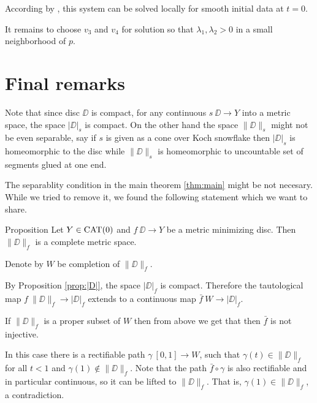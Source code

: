 \documentclass[a4paper,10pt]{amsart}
\begin{document}
According by \cite[Theorem 3.6]{bressan}, this system can be solved locally for smooth initial data at $t=0$.

It remains to choose $v_3$ and $v_4$ for solution so that $\lambda_1, \lambda_2>0$ in a small neighborhood of $p$.
\qeds

\section{Final remarks}

Note that since disc $\DD$ is compact, 
for any continuous $s\:\DD\to Y$ into a metric space,
the space $|\DD|_s$ is compact.
On the other hand the space $\|\DD\|_s$ might not be even separable,
say if $s$ is given as a cone over Koch snowflake then 
$|\DD|_s$ is homeomorphic to the disc while $\|\DD\|_s$ is homeomorphic to uncountable set of segments glued at one end.

The separablity condition in the main theorem \ref{thm:main}
might be not necesary.
While we tried to remove it, we found the following statement 
which we want to share.

\begin{thm}{Proposition}
Let $Y\in\mathop{\rm CAT}\nolimits(0)$ 
and 
$f\:\DD\to Y$ be a metric minimizing disc.
Then $\|\DD\|_f$ is a complete metric space.
\end{thm}

Denote by $W$ be completion of $\|\DD\|_f$.

By Proposition \ref{prop:|D|},
the space $|\DD|_f$ is compact.
Therefore the tautological map $f\:\|\DD\|_f\to |\DD|_f$ 
extends to a continuous map $\bar f\:W\to |\DD|_f$.

If $\|\DD\|_f$ is a proper subset of $W$ 
then from above we get that
then $\bar f$ is not injective.

In this case there is a rectifiable path $\gamma\:[0,1]\to W$,
such that $\gamma(t)\in\|\DD\|_f$ for all $t<1$ and $\gamma(1)\notin \|\DD\|_f$.
Note that the path $\bar f\circ \gamma$ is also rectifiable and in particular continuous, so it can be lifted to $\|\DD\|_f$.
That is, $\gamma(1)\in \|\DD\|_f$, a contradiction.
\qeds
\end{document}
